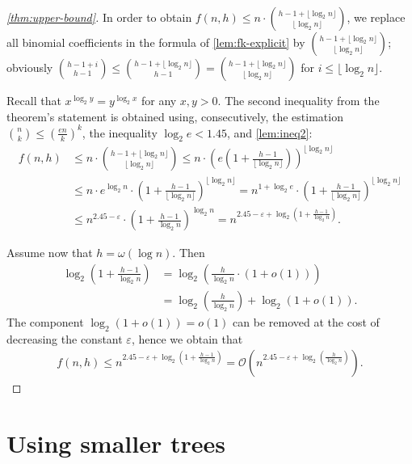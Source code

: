 \documentclass[envcountsect,envcountsame]{llncs}
\newcommand{\Oo}{\mathcal{O}}
\newcommand{\floor}[1]{\lfloor#1\rfloor}
\newcommand{\fk}{f}
\begin{document}
	\begin{proof}[\cref{thm:upper-bound}]
		In order to obtain $\fk(n, h) \leq n\cdot \binom{h - 1 + \floor{\log_2 n}}{\floor{\log_2 n}}$,
		we replace all binomial coefficients in the formula of \cref{lem:fk-explicit} by $\binom{h - 1 + \floor{\log_2 n}}{\floor{\log_2 n}}$;
		obviously $\binom{h - 1 + i}{h - 1} \leq \binom{h - 1 + \floor{\log_2 n}}{h - 1}=\binom{h - 1 + \floor{\log_2 n}}{\floor{\log_2 n}}$ for $i \leq \floor{\log_2 n}$.

		Recall that $x^{\log_2 y}=y^{\log_2 x}$ for any $x,y>0$.
		The second inequality from the theorem's statement is obtained using, consecutively,
		the estimation $\binom{n}{k} \leq \left( \frac{e n}{k} \right)^k$, the inequality $\log_2 e < 1{.}45$,
		and \cref{lem:ineq2}:
		\begin{align*}
			\fk(n,h)&\leq n\cdot\binom{h - 1 + \lfloor \log_2 n \rfloor}{\lfloor \log_2 n \rfloor}
				\leq n\cdot\left( e \left( 1 + \frac{h - 1}{\lfloor \log_2 n \rfloor} \right) \right)^{\lfloor \log_2 n \rfloor} \\
				&\leq n\cdot e^{\log_2 n}\cdot\left( 1 + \frac{h - 1}{\lfloor \log_2 n \rfloor} \right)^{\lfloor \log_2 n \rfloor}
				= n^{1 + \log_2 e}\cdot\left( 1 + \frac{h - 1}{\lfloor \log_2 n \rfloor} \right)^{\lfloor \log_2 n \rfloor} \\
				&\leq n^{2{.}45-\varepsilon}\cdot \left( 1 + \frac{h - 1}{\log_2 n} \right)^{\log_2 n}
				= n^{2{.}45-\varepsilon + \log_2 \left( 1 + \frac{h - 1}{\log_2 n} \right)}.
		\end{align*}

		Assume now that $h=\omega(\log n)$.
		Then
		\begin{align*}
			\log_2\left(1+\frac{h-1}{\log_2 n}\right)&=\log_2\left(\frac{h}{\log_2n}\cdot(1+o(1))\right)\\
			&=\log_2\left(\frac{h}{\log_2n}\right)+\log_2(1+o(1)).
		\end{align*}
		The component $\log_2(1+o(1))=o(1)$ can be removed at the cost of decreasing the constant $\varepsilon$, hence we obtain that
		\begin{align*}
			\fk(n,h)\leq n^{2{.}45-\varepsilon + \log_2 \left( 1 + \frac{h - 1}{\log_2 n} \right)}
				=\Oo\left(n^{2{.}45-\varepsilon + \log_2 \left(\frac{h}{\log_2 n} \right)}\right).
		\tag*{\qed}\end{align*}
	\end{proof}



\section{Using smaller trees}
\end{document}

